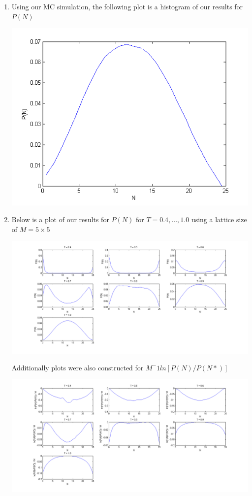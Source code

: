 \documentclass{article}
\begin{document}
\begin{enumerate}
  \item Using our MC simulation, the following plot is a histogram of our results for $P(N)$
    \begin{center}
      \includegraphics[scale=0.5]{prob2ii}
    \end{center}

  \item Below is a plot of our results for $P(N)$ for $T = 0.4,...,1.0$ using a lattice size of $M = 5 \times 5$
    \begin{center}
      \includegraphics[scale=0.5]{prob2iii-1}
    \end{center}

    Additionally plots were also constructed for $M^-1 ln\left[P(N)/P(N*)\right]$
    \begin{center}
      \includegraphics[scale=0.5]{prob2iii-2}
    \end{center}


\end{enumerate}
\end{document}
